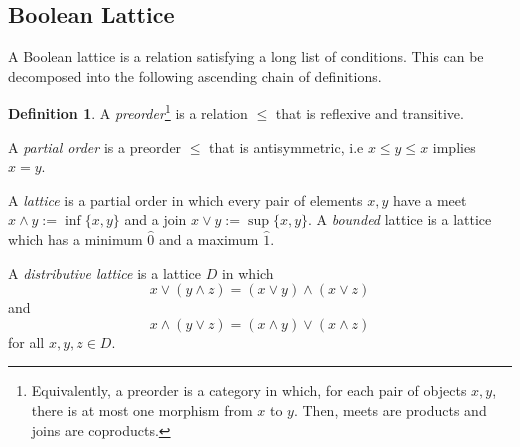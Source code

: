 \documentclass[12pt]{article}
\theoremstyle{definition}
\newtheorem*{definition}{\color{OliveGreen} Definition}
\begin{document}
\begin{multicols*}{2}\pagestyle{fancy}

\section*{Boolean Lattice}

A Boolean lattice is a relation satisfying a long list of conditions. This can be decomposed into the following ascending chain of definitions.

\begin{definition}
	A \emph{preorder}\footnote{Equivalently, a preorder is a category in which, for each pair of objects $x,y$, there is at most one morphism from $x$ to $y$. Then, meets are products and joins are coproducts.} is a relation $\leq$ that is reflexive and transitive.
	
	A \emph{partial order} is a preorder $\leq$ that is antisymmetric, i.e $x\leq y\leq x$ implies $x=y$.
	
	A \emph{lattice} is a partial order in which every pair of elements $x,y$ have a meet $x\land y := \inf\{x,y\}$ and a join $x\lor y := \sup\{x,y\}$. A \emph{bounded} lattice is a lattice which has a minimum $\hat 0$ and a maximum $\hat 1$.
	
	A \emph{distributive lattice} is a lattice $D$ in which
	\[
		x\lor(y\land z) = (x\lor y)\land(x\lor z)
	\]
	and
	\[
		x\land(y\lor z) = (x\land y)\lor(x\land z)
	\]
	for all $x,y,z\in D$.
	

\end{definition}
\end{multicols*}
\end{document}
